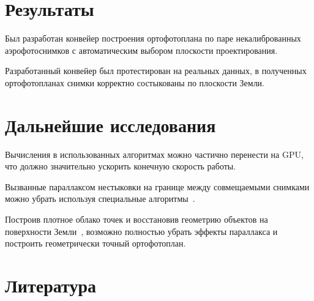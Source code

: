 \documentclass[a4paper,12pt]{article}
\begin{document}

\section{Результаты}
Был разработан конвейер построения ортофотоплана по паре некалиброванных 
аэрофотоснимков с автоматическим выбором плоскости проектирования. 

Разработанный конвейер был протестирован на реальных данных, в полученных 
ортофотопланах снимки корректно состыкованы по плоскости Земли.

\section{Дальнейшие исследования}

Вычисления в использованных алгоритмах можно частично перенести на GPU, что 
должно значительно ускорить конечную скорость работы.

Вызванные параллаксом нестыковки на границе между совмещаемыми снимками можно
убрать используя специальные алгоритмы~\cite{shum00mosaic, kang04mpps}.

Построив плотное облако точек и восстановив геометрию 
объектов на поверхности Земли~\cite{furu09mvs}, возможно полностью убрать эффекты 
параллакса и построить геометрически точный ортофотоплан.

\section{Литература}
\end{document}

